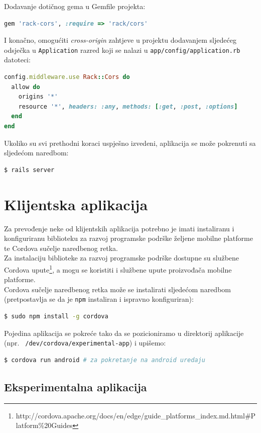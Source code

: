 Dodavanje dotičnog gema u Gemfile projekta:
\begin{lstlisting}[language=ruby]
gem 'rack-cors', :require => 'rack/cors'
\end{lstlisting}

I konačno, omogućiti \textit{cross-origin} zahtjeve u projektu dodavanjem sljedećeg odsječka u \texttt{Application} razred koji se nalazi u \texttt{app/config/application.rb} datoteci:
\begin{lstlisting}[language=ruby]
config.middleware.use Rack::Cors do
  allow do
    origins '*'
    resource '*', headers: :any, methods: [:get, :post, :options]
  end
end
\end{lstlisting}

Ukoliko su svi prethodni koraci uspješno izvedeni, aplikacija se može pokrenuti sa sljedećom naredbom:
\begin{lstlisting}[language=bash]
$ rails server
\end{lstlisting}


\section{Klijentska aplikacija}

Za prevođenje neke od klijentskih aplikacija potrebno je imati instaliranu i konfiguriranu biblioteku za razvoj programske podrške željene mobilne platforme te Cordova sučelje naredbenog retka.
\\
Za instalaciju biblioteke za razvoj programske podrške dostupne su službene Cordova upute\footnote{http://cordova.apache.org/docs/en/edge/guide\_platforms\_index.md.html\#Platform\%20Guides}, a mogu se koristiti i službene upute proizvođača mobilne platforme.
\\
Cordova sučelje naredbenog retka može se instalirati sljedećom naredbom (pretpostavlja se da je \texttt{npm} instaliran i ispravno konfiguriran):
\begin{lstlisting}[language=bash]
$ sudo npm install -g cordova
\end{lstlisting}

Pojedina aplikacija se pokreće tako da se pozicioniramo u direktorij aplikacije (npr. \texttt{~/dev/cordova/experimental-app}) i  upišemo:
\begin{lstlisting}[language=bash]
$ cordova run android # za pokretanje na android uredaju
\end{lstlisting}

\subsection{Eksperimentalna aplikacija}

